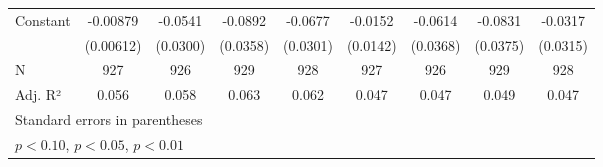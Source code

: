 {\begin{tabular}{l*{8}{c}}
Constant            &    -0.00879         &     -0.0541\sym{*}  &     -0.0892\sym{**} &     -0.0677\sym{**} &     -0.0152         &     -0.0614\sym{*}  &     -0.0831\sym{**} &     -0.0317         \\
                    &   (0.00612)         &    (0.0300)         &    (0.0358)         &    (0.0301)         &    (0.0142)         &    (0.0368)         &    (0.0375)         &    (0.0315)         \\
\hline
N                   &         927         &         926         &         929         &         928         &         927         &         926         &         929         &         928         \\
Adj. R²             &       0.056         &       0.058         &       0.063         &       0.062         &       0.047         &       0.047         &       0.049         &       0.047         \\
\hline\hline
\multicolumn{9}{l}{\footnotesize Standard errors in parentheses}\\
\multicolumn{9}{l}{\footnotesize \sym{*} \(p<0.10\), \sym{**} \(p<0.05\), \sym{***} \(p<0.01\)}\\
\end{tabular}
}
